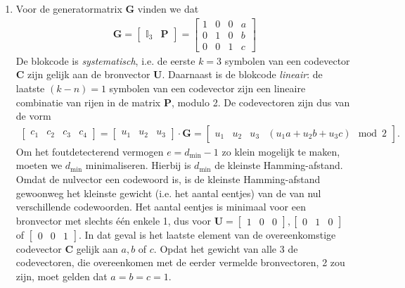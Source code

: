 \documentclass[kulak]{kulakarticle}
\begin{document}
	\begin{enumerate}
		\item \renewcommand{\arraystretch}{1}
		Voor de generatormatrix \(\mathbf{G}\) vinden we dat \begin{align*}
			\mathbf{G} = \left[\begin{array}{c|c}
				\mathbb{I}_3 & \mathbf{P}
			\end{array}\right] = \left[\begin{array}{ccc|c}
				1 & 0 & 0 & a \\
				0 & 1 & 0 & b \\
				0 & 0 & 1 & c
			\end{array}\right]
		\end{align*}
		De blokcode is \textit{systematisch}, i.e. de eerste \(k=3\) symbolen van een codevector \(\mathbf{C}\) zijn gelijk aan de bronvector \(\mathbf{U}\). Daarnaast is de blokcode \textit{lineair}: de laatste \((k-n)=1\) symbolen van een codevector zijn een lineaire combinatie van rijen in de matrix \(\mathbf{P}\), modulo 2. De codevectoren zijn dus van de vorm \begin{align*}
			\begin{bmatrix}
				c_1 & c_2 & c_3 & c_4
			\end{bmatrix} = \begin{bmatrix}
				u_1 & u_2 & u_3
			\end{bmatrix} \cdot \mathbf{G} = \left[\begin{array}{ccc|c}
				u_1 & u_2 & u_3 & (u_1 a + u_2 b + u_3 c) \mod 2
			\end{array}\right].
		\end{align*}
		Om het foutdetecterend vermogen \(e=d_{\min} - 1\) zo klein mogelijk te maken, moeten we \(d_{\min}\) minimaliseren. Hierbij is \(d_{\min}\) de kleinste Hamming-afstand. Omdat de nulvector een codewoord is, is de kleinste Hamming-afstand gewoonweg het kleinste gewicht (i.e. het aantal eentjes) van de van nul verschillende codewoorden. Het aantal eentjes is minimaal voor een bronvector met slechts één enkele 1, dus voor \(\mathbf{U} = \begin{bmatrix}
			1 & 0 & 0
		\end{bmatrix}, \begin{bmatrix}
		0 & 1 & 0
		\end{bmatrix}\) of \(\begin{bmatrix}
		0 & 0 & 1
		\end{bmatrix}\). In dat geval is het laatste element van de overeenkomstige codevector \(\mathbf{C}\) gelijk aan \(a,b\) of \(c\). Opdat het gewicht van alle 3 de codevectoren, die overeenkomen met de eerder vermelde bronvectoren, 2 zou zijn, moet gelden dat \(a=b=c=1\).


\end{enumerate}
\end{document}
